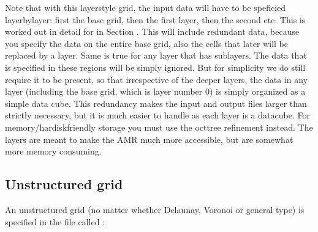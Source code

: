 \documentclass[letterpaper,10pt,english]{sphinxmanual}
\begin{document}
Note that with this layer\sphinxhyphen{}style grid, the input data will have to be speficied
layer\sphinxhyphen{}by\sphinxhyphen{}layer: first the base grid, then the first layer, then the second
etc. This is worked out in detail for  in Section
{\hyperref[\detokenize{inputoutputfiles:sec-dustdens}]{}}. This will include redundant data, because you specify the
data on the entire base grid, also the cells that later will be replaced by a
layer. Same is true for any layer that has sub\sphinxhyphen{}layers. The data that is
specified in these regions will be simply ignored. But for simplicity we do
still require it to be present, so that irrespective of the deeper layers, the
data in any layer (including the base grid, which is layer number 0) is simply
organized as a simple data cube. This redundancy makes the input and output
files larger than strictly necessary, but it is much easier to handle as each
layer is a datacube. For memory/hardisk\sphinxhyphen{}friendly storage you must use the
oct\sphinxhyphen{}tree refinement instead. The layers are meant to make the AMR much more
accessible, but are somewhat more memory consuming.


\subsection{Unstructured grid}
\label{\detokenize{inputoutputfiles:unstructured-grid}}\label{\detokenize{inputoutputfiles:sec-unstr-grid}}
An unstructured grid (no matter whether Delaunay, Voronoi or general type) is
specified in the file called :
\end{document}
